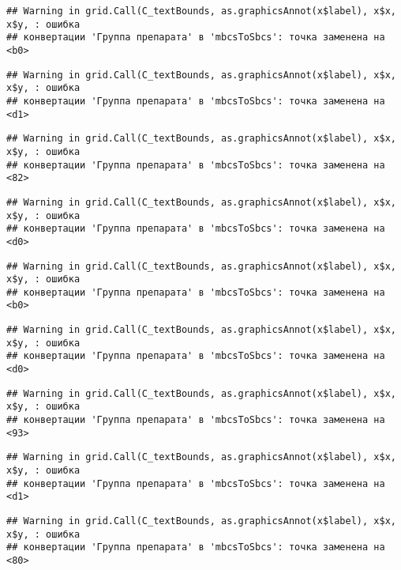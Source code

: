 \documentclass[
]{article}
\begin{document}
\begin{verbatim}
## Warning in grid.Call(C_textBounds, as.graphicsAnnot(x$label), x$x, x$y, : ошибка
## конвертации 'Группа препарата' в 'mbcsToSbcs': точка заменена на <b0>
\end{verbatim}

\begin{verbatim}
## Warning in grid.Call(C_textBounds, as.graphicsAnnot(x$label), x$x, x$y, : ошибка
## конвертации 'Группа препарата' в 'mbcsToSbcs': точка заменена на <d1>
\end{verbatim}

\begin{verbatim}
## Warning in grid.Call(C_textBounds, as.graphicsAnnot(x$label), x$x, x$y, : ошибка
## конвертации 'Группа препарата' в 'mbcsToSbcs': точка заменена на <82>
\end{verbatim}

\begin{verbatim}
## Warning in grid.Call(C_textBounds, as.graphicsAnnot(x$label), x$x, x$y, : ошибка
## конвертации 'Группа препарата' в 'mbcsToSbcs': точка заменена на <d0>
\end{verbatim}

\begin{verbatim}
## Warning in grid.Call(C_textBounds, as.graphicsAnnot(x$label), x$x, x$y, : ошибка
## конвертации 'Группа препарата' в 'mbcsToSbcs': точка заменена на <b0>
\end{verbatim}

\begin{verbatim}
## Warning in grid.Call(C_textBounds, as.graphicsAnnot(x$label), x$x, x$y, : ошибка
## конвертации 'Группа препарата' в 'mbcsToSbcs': точка заменена на <d0>
\end{verbatim}

\begin{verbatim}
## Warning in grid.Call(C_textBounds, as.graphicsAnnot(x$label), x$x, x$y, : ошибка
## конвертации 'Группа препарата' в 'mbcsToSbcs': точка заменена на <93>
\end{verbatim}

\begin{verbatim}
## Warning in grid.Call(C_textBounds, as.graphicsAnnot(x$label), x$x, x$y, : ошибка
## конвертации 'Группа препарата' в 'mbcsToSbcs': точка заменена на <d1>
\end{verbatim}

\begin{verbatim}
## Warning in grid.Call(C_textBounds, as.graphicsAnnot(x$label), x$x, x$y, : ошибка
## конвертации 'Группа препарата' в 'mbcsToSbcs': точка заменена на <80>
\end{verbatim}
\end{document}
